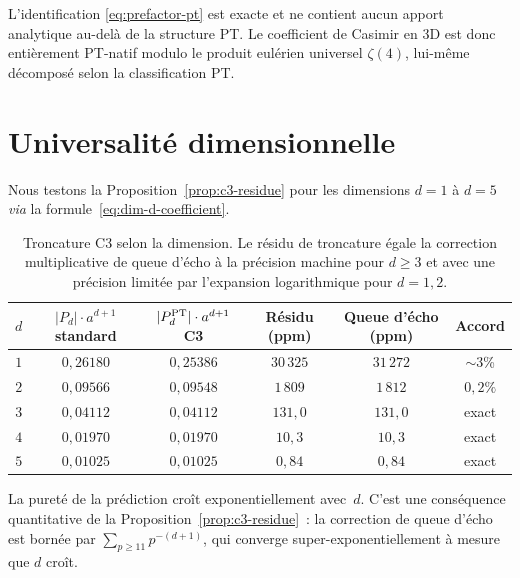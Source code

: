 \documentclass[11pt,a4paper]{article}
\begin{document}
L'identification \eqref{eq:prefactor-pt} est exacte et ne contient aucun apport analytique
au-delà de la structure PT. Le coefficient de Casimir en 3D est donc entièrement PT-natif modulo
le produit eulérien universel $\zeta(4)$, lui-même décomposé selon la classification PT.

\section{Universalité dimensionnelle}
\label{sec:universality}

Nous testons la Proposition~\ref{prop:c3-residue} pour les dimensions $d = 1$ à $d = 5$ \emph{via}
la formule~\eqref{eq:dim-d-coefficient}.

\begin{table}[ht]
\centering
\caption{Troncature C3 selon la dimension. Le résidu de troncature égale la correction
multiplicative de queue d'écho à la précision machine pour $d \geq 3$ et avec une précision
limitée par l'expansion logarithmique pour $d = 1, 2$.}
\label{tab:dimensional-scan}
\begin{tabular}{cccccc}
\toprule
$d$ & $|P_{d}| \cdot a^{d+1}$ standard & $|P_{d}^{\rm PT}| \cdot a^{d+1}$ C3 & Résidu (ppm) & Queue d'écho (ppm) & Accord \\
\midrule
$1$ & $0{,}26180$ & $0{,}25386$ & $30\,325$ & $31\,272$ & $\sim$3\% \\
$2$ & $0{,}09566$ & $0{,}09548$ & $1\,809$ & $1\,812$ & $0{,}2\%$ \\
$3$ & $0{,}04112$ & $0{,}04112$ & $131{,}0$ & $131{,}0$ & exact \\
$4$ & $0{,}01970$ & $0{,}01970$ & $10{,}3$ & $10{,}3$ & exact \\
$5$ & $0{,}01025$ & $0{,}01025$ & $0{,}84$ & $0{,}84$ & exact \\
\bottomrule
\end{tabular}
\end{table}

La pureté de la prédiction croît exponentiellement avec~$d$. C'est une conséquence quantitative
de la Proposition~\ref{prop:c3-residue}~: la correction de queue d'écho est bornée par
$\sum_{p \geq 11} p^{-(d+1)}$, qui converge super-exponentiellement à mesure que $d$ croît.
\end{document}
